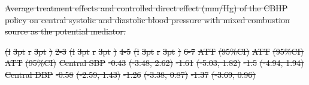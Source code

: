 \documentclass[
  letterpaper,
  DIV=11,
  numbers=noendperiod]{scrartcl}
\makeatletter
\renewenvironment{table}%
   {\renewcommand\familydefault\sfdefault
    \@float{table}}
   {\end@float}
\providecommand{\DIFdeltex}[1]{{\protect\color{red}\sout{#1}}}                      %
\providecommand{\DIFdelbegin}{} %
\providecommand{\DIFdelFL}[1]{\DIFdel{#1}} %
\providecommand{\DIFaddbeginFL}{} %
\providecommand{\DIFaddendFL}{} %
\providecommand{\DIFdelbeginFL}{} %
\providecommand{\DIFdelendFL}{} %
\providecommand{\DIFdel}[1]{\texorpdfstring{\DIFdeltex{#1}}{}} %
\newcommand{\DIFscaledelfig}{0.5}
\newlength{\DIFdelgraphicswidth} %
\newlength{\DIFdelgraphicsheight} %
\newcommand{\DIFaddincludegraphics}[2][]{{\color{blue}\fbox{\DIFOincludegraphics[#1]{#2}}}} %
\newcommand{\DIFdelincludegraphics}[2][]{%
\sbox{\DIFdelgraphicsbox}{\DIFOincludegraphics[#1]{#2}}%
\settoboxwidth{\DIFdelgraphicswidth}{\DIFdelgraphicsbox} %
\settoboxtotalheight{\DIFdelgraphicsheight}{\DIFdelgraphicsbox} %
\scalebox{\DIFscaledelfig}{%
\parbox[b]{\DIFdelgraphicswidth}{\usebox{\DIFdelgraphicsbox}\\[-\baselineskip] \rule{\DIFdelgraphicswidth}{0em}}\llap{\resizebox{\DIFdelgraphicswidth}{\DIFdelgraphicsheight}{%
\setlength{\unitlength}{\DIFdelgraphicswidth}%
\begin{picture}(1,1)%
\thicklines\linethickness{2pt} %
{\color[rgb]{1,0,0}\put(0,0){\framebox(1,1){}}}%
{\color[rgb]{1,0,0}\put(0,0){\line( 1,1){1}}}%
{\color[rgb]{1,0,0}\put(0,1){\line(1,-1){1}}}%
\end{picture}%
}\hspace*{3pt}}} %
} %
\DeclareRobustCommand{\DIFdelbegin}{\DIFOdelbegin \let\includegraphics\DIFdelincludegraphics} %
\DeclareRobustCommand{\DIFaddbeginFL}{\DIFOaddbeginFL \let\includegraphics\DIFaddincludegraphics} %
\DeclareRobustCommand{\DIFaddendFL}{\DIFOaddendFL \let\includegraphics\DIFOincludegraphics} %
\DeclareRobustCommand{\DIFdelbeginFL}{\DIFOdelbeginFL \let\includegraphics\DIFdelincludegraphics} %
\DeclareRobustCommand{\DIFdelendFL}{\DIFOaddendFL \let\includegraphics\DIFOincludegraphics} %
\makeatother
\begin{document}
\DIFdelbegin %
{%
\DIFdelFL{Average treatment effects and controlled direct effect (mm/Hg) of the
CBHP policy on central systolic and diastolic blood pressure with mixed
combustion source as the potential mediator. }}%
\DIFdelendFL \DIFaddbeginFL \begin{table}
\DIFaddendFL 

\DIFdelbeginFL %
\DIFdelFL{(l}%
\DIFdelFL{3pt}%
\DIFdelFL{r}%
\DIFdelFL{3pt}%
\DIFdelFL{)}%
\DIFdelFL{2-3}%
\DIFdelFL{(l}%
\DIFdelFL{3pt}%
\DIFdelFL{r}%
\DIFdelFL{3pt}%
\DIFdelFL{)}%
\DIFdelFL{4-5}%
\DIFdelFL{(l}%
\DIFdelFL{3pt}%
\DIFdelFL{r}%
\DIFdelFL{3pt}%
\DIFdelFL{)}%
\DIFdelFL{6-7}%
\DIFdelFL{ATT }%
\DIFdelFL{(95\%CI) }%
\DIFdelFL{ATT }%
\DIFdelFL{(95\%CI) }%
\DIFdelFL{ATT }%
\DIFdelFL{(95\%CI)}%
\DIFdelFL{Central SBP }%
\DIFdelFL{-0.43 }%
\DIFdelFL{(-3.48, 2.62) }%
\DIFdelFL{-1.61 }%
\DIFdelFL{(-5.03, 1.82) }%
\DIFdelFL{-1.5 }%
\DIFdelFL{(-4.94, 1.94)}%
\DIFdelFL{Central DBP }%
\DIFdelFL{-0.58 }%
\DIFdelFL{(-2.59, 1.43) }%
\DIFdelFL{-1.26 }%
\DIFdelFL{(-3.38, 0.87) }%
\DIFdelFL{-1.37 }%
\DIFdelFL{(-3.69, 0.96)}%

\end{table}
\end{document}
